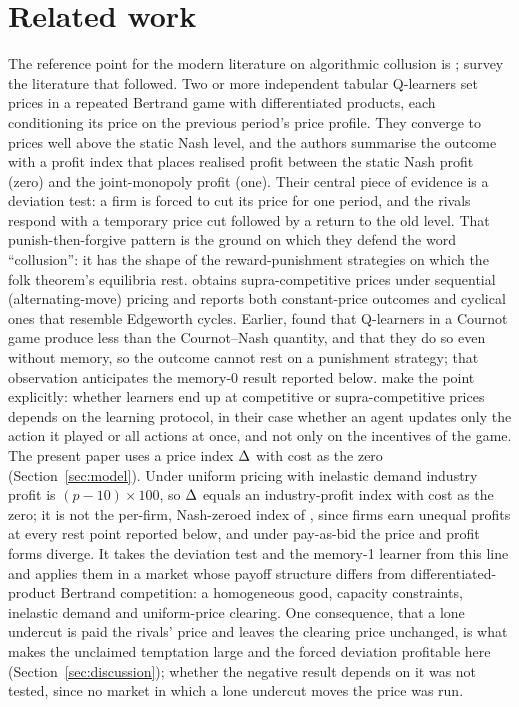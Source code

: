 \section{Related work}\label{sec:related}

The reference point for the modern literature on algorithmic collusion is \citet{calvano2020}; \citet{bichler2025} survey the literature that followed. Two or more independent tabular Q-learners set prices in a repeated Bertrand game with differentiated products, each conditioning its price on the previous period's price profile. They converge to prices well above the static Nash level, and the authors summarise the outcome with a profit index that places realised profit between the static Nash profit (zero) and the joint-monopoly profit (one). Their central piece of evidence is a deviation test: a firm is forced to cut its price for one period, and the rivals respond with a temporary price cut followed by a return to the old level. That punish-then-forgive pattern is the ground on which they defend the word ``collusion'': it has the shape of the reward-punishment strategies on which the folk theorem's equilibria rest. \citet{klein2021} obtains supra-competitive prices under sequential (alternating-move) pricing and reports both constant-price outcomes and cyclical ones that resemble Edgeworth cycles. Earlier, \citet{waltman2008} found that Q-learners in a Cournot game produce less than the Cournot--Nash quantity, and that they do so even without memory, so the outcome cannot rest on a punishment strategy; that observation anticipates the memory-0 result reported below. \citet{asker2022} make the point explicitly: whether learners end up at competitive or supra-competitive prices depends on the learning protocol, in their case whether an agent updates only the action it played or all actions at once, and not only on the incentives of the game. 
The present paper uses a price index $\Delta$ with cost as the zero (Section~\ref{sec:model}). Under uniform pricing with inelastic demand industry profit is $(p-10)\times 100$, so $\Delta$ equals an industry-profit index with cost as the zero; it is not the per-firm, Nash-zeroed index of \citet{calvano2020}, since firms earn unequal profits at every rest point reported below, and under pay-as-bid the price and profit forms diverge. It takes the deviation test and the memory-1 learner from this line and applies them in a market whose payoff structure differs from differentiated-product Bertrand competition: a homogeneous good, capacity constraints, inelastic demand and uniform-price clearing. One consequence, that a lone undercut is paid the rivals' price and leaves the clearing price unchanged, is what makes the unclaimed temptation large and the forced deviation profitable here (Section~\ref{sec:discussion}); whether the negative result depends on it was not tested, since no market in which a lone undercut moves the price was run.

